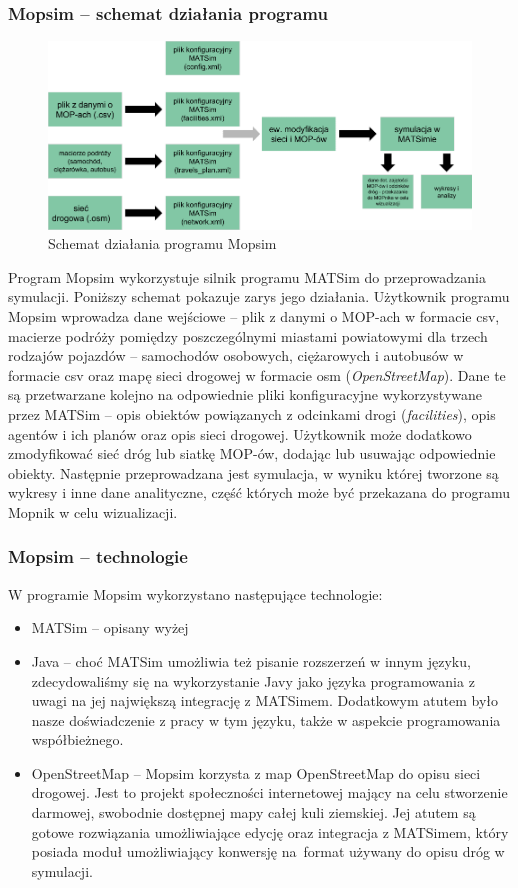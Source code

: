 \subsubsection{Mopsim -- schemat działania programu}
    \begin{figure}[h]
        \caption{Schemat działania programu Mopsim}
        \includegraphics[width=\textwidth]{images/mopsim-workflow.png}
    \end{figure}
Program Mopsim wykorzystuje silnik programu MATSim do przeprowadzania symulacji. Poniższy schemat pokazuje zarys jego działania. Użytkownik programu Mopsim wprowadza dane wejściowe -- plik z danymi o MOP-ach w formacie csv, macierze podróży pomiędzy poszczególnymi miastami powiatowymi dla trzech rodzajów pojazdów -- samochodów osobowych, ciężarowych i autobusów w formacie csv oraz mapę sieci drogowej w formacie osm (\textit{OpenStreetMap}). Dane te są przetwarzane kolejno na odpowiednie pliki konfiguracyjne wykorzystywane przez MATSim -- opis obiektów powiązanych z odcinkami drogi (\textit{facilities}), opis agentów i ich planów oraz opis sieci drogowej. Użytkownik może dodatkowo zmodyfikować sieć dróg lub siatkę MOP-ów, dodając lub usuwając odpowiednie obiekty. Następnie przeprowadzana jest symulacja, w wyniku której tworzone są wykresy i inne dane analityczne, część których może być przekazana do programu Mopnik w celu wizualizacji.
\newpage
\subsubsection{Mopsim -- technologie}
W programie Mopsim wykorzystano następujące technologie:
\begin{itemize}
\item MATSim -- opisany wyżej
\item Java -- choć MATSim umożliwia też pisanie rozszerzeń w innym języku, zdecydowaliśmy się na wykorzystanie Javy jako języka programowania z uwagi na jej największą integrację z MATSimem. Dodatkowym atutem było nasze doświadczenie z pracy w tym języku, także w aspekcie programowania współbieżnego.
\item OpenStreetMap -- Mopsim korzysta z map OpenStreetMap do opisu sieci drogowej. Jest to projekt społeczności internetowej mający na celu stworzenie darmowej, swobodnie dostępnej mapy całej kuli ziemskiej. Jej atutem są gotowe rozwiązania umożliwiające edycję oraz integracja z MATSimem, który posiada moduł umożliwiający konwersję na~format używany do opisu dróg w symulacji.
\end{itemize}

